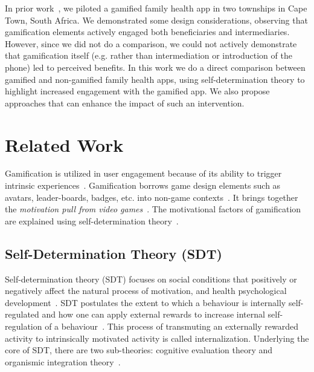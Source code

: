 \documentclass{sig-alternate}
\begin{document}
In prior work~\cite{katule2016:leveraging}, we piloted a gamified family health app in two townships in Cape Town, South Africa. We demonstrated some design considerations, observing that gamification elements actively engaged both beneficiaries and intermediaries.  However, since we did not do a comparison, we could not actively demonstrate that gamification itself (e.g. rather than intermediation or introduction of the phone) led to perceived benefits. In this work we do a direct comparison between gamified and non-gamified family health apps, using self-determination theory to highlight increased engagement with the gamified app.
We also propose approaches that can enhance the impact of such an intervention. 

\section{Related Work} 
Gamification is utilized in user engagement because of its ability to trigger intrinsic experiences~\cite{hamari2014persuasive}. Gamification borrows game design elements such as avatars, leader-boards, badges, etc. into non-game contexts~\cite{deterding2011game}. It brings together the \emph{motivation pull from video games}~\cite{ryan2006:motivationalpull}. The motivational  factors of gamification are explained using self-determination theory~\cite{deci1985:intrinsic}.    

\subsection{Self-Determination Theory (SDT)}
Self-determination theory (SDT) focuses on social conditions that positively or negatively affect the natural process of motivation, and health psychological development~\cite{ryan2000:self}. SDT postulates the extent to which a behaviour is internally self-regulated and how one can apply external rewards to increase internal self-regulation of a behaviour~\cite{ryan2000:self}. This process of transmuting an externally rewarded activity to intrinsically motivated activity is called internalization. Underlying the core of SDT, there are two sub-theories: cognitive evaluation theory and organismic integration theory~\cite{ryan2000:self}. 
\end{document}
